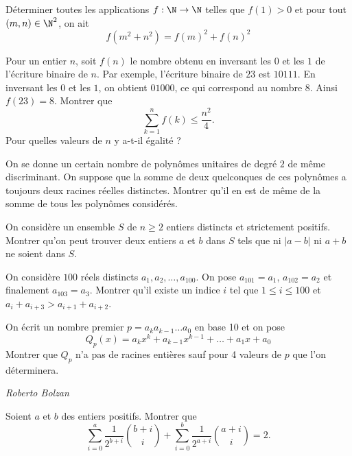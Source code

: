 \begin{exo}{}
Déterminer toutes les applications $f : \N \rightarrow \N$ telles que $f(1)>0$ et pour tout $(m,n) \in \N^{2}$, on ait
\[f(m^2+n^2) = f(m)^2+f(n)^2\]
\end{exo}

\begin{exo}{}
Pour un entier $n$, soit $f(n)$ le nombre obtenu en inversant les $0$ et les $1$ de l'écriture binaire de $n$. Par exemple, l'écriture binaire de $23$ est $10111$. En inversant les $0$ et les $1$, on obtient $01000$, ce qui correspond au nombre $8$. Ainsi $f(23)=8$. Montrer que
\[\sum_{k=1}^n f(k) \leq \frac{n^2}{4}.\]
Pour quelles valeurs de $n$ y a-t-il égalité ?
\end{exo}


\begin{exo}{}
On se donne un certain nombre de polynômes unitaires de degré $2$ de même discriminant. On suppose que la somme de deux quelconques de ces polynômes a toujours deux racines réelles distinctes. Montrer qu'il en est de même de la somme de tous les polynômes considérés.
\end{exo}


\begin{exo}{}
On considère un ensemble $S$ de $n\ge 2$ entiers distincts et strictement positifs. Montrer qu'on peut trouver deux entiers $a$ et $b$ dans $S$ tels que ni $|a-b|$ ni $a+b$ ne soient dans $S$.
 \end{exo}

\begin{exo}{}
On considère $100$ réels distincts $a_1,a_2,\dots,a_{100}$. On pose $a_{101}=a_1$, $a_{102}=a_2$ et finalement $a_{103}=a_3$. Montrer qu'il existe un indice $i$ tel que $1\le i \le 100$ et $a_{i}+a_{i+3}>a_{i+1}+a_{i+2}$.
\end{exo}
\begin{exo}{}
On écrit un nombre premier $p=a_ka_{k-1}\dots a_0$ en base 10 et on pose
\[Q_p(x)=a_kx^k+a_{k-1}x^{k-1}+\dots+a_1x+a_0\]
Montrer que $Q_p$ n'a pas de racines entières sauf pour 4 valeurs de $p$ que l'on déterminera.

\medskip
\textit{Roberto Bolzan}
\end{exo}

%
\begin{exo}{}
Soient $a$ et $b$ des entiers positifs. Montrer que
$$\displaystyle \sum_{i=0}^{a} \frac{1}{2^{b+i}} \binom{b+i}{i} + \displaystyle\sum_{i=0}^{b} \frac{1}{2^{a+i}} \binom{a+i}{i} = 2.$$
\end{exo}


